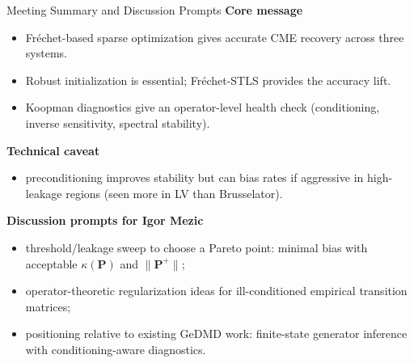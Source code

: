 \documentclass[10pt,aspectratio=169]{beamer}
\newcommand{\bP}{\mathbf{P}}
\begin{document}
\begin{frame}{Meeting Summary and Discussion Prompts}
\textbf{Core message}
\begin{itemize}
    \item Fr\'{e}chet-based sparse optimization gives accurate CME recovery across three systems.
    \item Robust initialization is essential; Fr\'{e}chet-STLS provides the accuracy lift.
    \item Koopman diagnostics give an operator-level health check (conditioning, inverse sensitivity, spectral stability).
\end{itemize}

\vspace{0.4em}
\textbf{Technical caveat}
\begin{itemize}
    \item preconditioning improves stability but can bias rates if aggressive in high-leakage regions (seen more in LV than Brusselator).
\end{itemize}

\vspace{0.4em}
\textbf{Discussion prompts for Igor Mezic}
\begin{itemize}
    \item threshold/leakage sweep to choose a Pareto point: minimal bias with acceptable $\kappa(\bP)$ and $\|\bP^+\|$;
    \item operator-theoretic regularization ideas for ill-conditioned empirical transition matrices;
    \item positioning relative to existing GeDMD work: finite-state generator inference with conditioning-aware diagnostics.
\end{itemize}
\end{frame}
\end{document}
